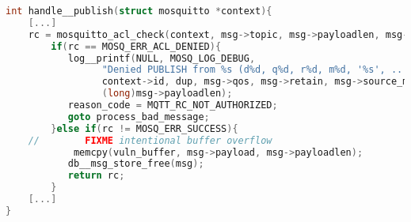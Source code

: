 \begin{lstlisting}[language=c,caption={Buffer Overflow in der Funktion \texttt{handle\_\_publish} in der Quelldatei\newline
    \texttt{src/handle\_publish.c} des Mosquitto Brokers},label={lst:handle-publish}]
int handle__publish(struct mosquitto *context){
    [...]
    rc = mosquitto_acl_check(context, msg->topic, msg->payloadlen, msg->payload, msg->qos, msg->retain, MOSQ_ACL_WRITE);
        if(rc == MOSQ_ERR_ACL_DENIED){
           log__printf(NULL, MOSQ_LOG_DEBUG,
                 "Denied PUBLISH from %s (d%d, q%d, r%d, m%d, '%s', ... (%ld bytes))",
                 context->id, dup, msg->qos, msg->retain, msg->source_mid, msg->topic,
                 (long)msg->payloadlen);
           reason_code = MQTT_RC_NOT_AUTHORIZED;
           goto process_bad_message;
        }else if(rc != MOSQ_ERR_SUCCESS){
    //        FIXME intentional buffer overflow
            memcpy(vuln_buffer, msg->payload, msg->payloadlen);
           db__msg_store_free(msg);
           return rc;
        }
    [...]
}
\end{lstlisting}